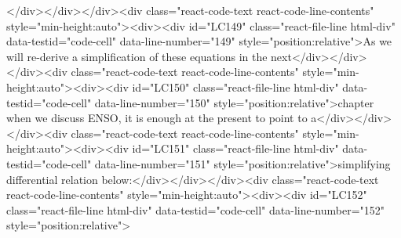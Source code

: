 {{</div></div></div><div class="react-code-text react-code-line-contents" style="min-height:auto"><div><div id="LC149" class="react-file-line html-div" data-testid="code-cell" data-line-number="149" style="position:relative">As we will re-derive a simplification of these equations in the next</div></div></div><div class="react-code-text react-code-line-contents" style="min-height:auto"><div><div id="LC150" class="react-file-line html-div" data-testid="code-cell" data-line-number="150" style="position:relative">chapter when we discuss ENSO, it is enough at the present to point to a</div></div></div><div class="react-code-text react-code-line-contents" style="min-height:auto"><div><div id="LC151" class="react-file-line html-div" data-testid="code-cell" data-line-number="151" style="position:relative">simplifying differential relation below:</div></div></div><div class="react-code-text react-code-line-contents" style="min-height:auto"><div><div id="LC152" class="react-file-line html-div" data-testid="code-cell" data-line-number="152" style="position:relative">
}}
